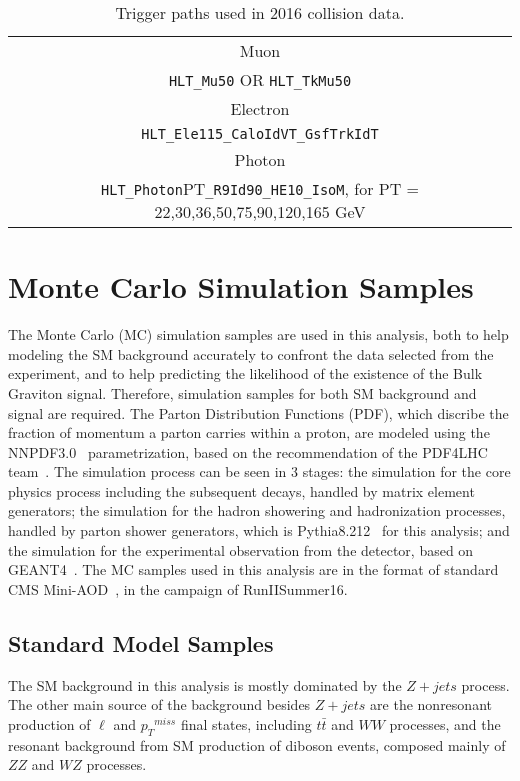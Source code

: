 \begin{table}[htbp!]
\begin{small}
   \caption{Trigger paths used in 2016 collision data.
   \label{tab:triggerPaths}}
   \centering
   \begin{tabular}{ c }
\hline\hline
Muon  \\ \texttt{HLT\_Mu50} OR \texttt{HLT\_TkMu50}  \\ \hline
Electron \\ \texttt{HLT\_Ele115\_CaloIdVT\_GsfTrkIdT} \\ \hline
Photon \\ \texttt{HLT\_Photon}PT\texttt{\_R9Id90\_HE10\_IsoM},  for PT = 22,30,36,50,75,90,120,165 GeV \\  
\hline
\hline
    \end{tabular}
\end{small}
\end{table}


\section{Monte Carlo Simulation Samples}
The Monte Carlo (MC) simulation samples are used in this analysis, both to help modeling the SM background accurately to confront the data selected from the experiment, and to help predicting the likelihood of the existence of the Bulk Graviton signal. Therefore, simulation samples for both SM background and signal are required. The Parton Distribution Functions (PDF), which discribe the fraction of momentum a parton carries within a proton, are modeled using the NNPDF3.0~\cite{sample_nnpdf30} parametrization, based on the recommendation of the PDF4LHC team~\cite{sample_pdf4lhc}. The simulation process can be seen in 3 stages: the simulation for the core physics process including the subsequent decays, handled by matrix element generators; the simulation for the hadron showering and hadronization processes, handled by parton shower generators, which is Pythia8.212~\cite{sample_pythia} for this analysis; and the simulation for the experimental observation from the detector, based on GEANT4~\cite{sample_geant4}. The MC samples used in this analysis are in the format of standard CMS Mini-AOD~\cite{sample_miniaod}, in the campaign of RunIISummer16.

\subsection{Standard Model Samples}
The SM background in this analysis is mostly dominated by the $Z+jets$ process. The other main source of the background besides $Z+jets$ are the nonresonant production of $\ell$ and ${p_{T}}^{miss}$ final states, including $t\bar{t}$ and $WW$ processes, and the resonant background from SM production of diboson events, composed mainly of $ZZ$ and $WZ$ processes. 

